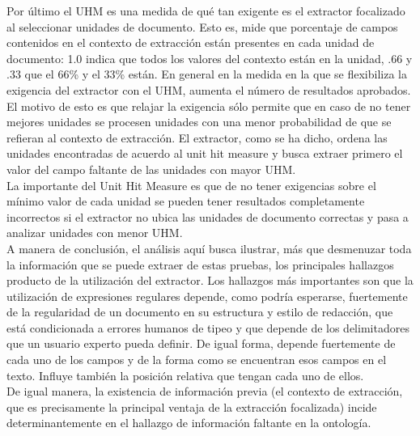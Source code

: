 Por último el UHM es una medida de qué tan exigente es el extractor focalizado al seleccionar unidades de documento. Esto es, mide que porcentaje de campos contenidos en el contexto de extracción están presentes en cada unidad de documento: 1.0 indica que todos los valores del contexto están en la unidad, .66 y .33 que el 66\% y el 33\% están. En general en la medida en la que se flexibiliza la exigencia del extractor con el UHM, aumenta el número de resultados aprobados. El motivo de esto es que relajar la exigencia sólo permite que en caso de no tener mejores unidades se procesen unidades con una menor probabilidad de que se refieran al contexto de extracción. El extractor, como se ha dicho, ordena las unidades encontradas de acuerdo al unit hit measure y busca extraer primero el valor del campo faltante de las unidades con mayor UHM. \\

La importante del Unit Hit Measure es que de no tener exigencias sobre el mínimo valor de cada unidad se pueden tener resultados completamente incorrectos si el extractor no ubica las unidades de documento correctas y pasa a analizar unidades con menor UHM. \\

A manera de conclusión, el análisis aquí busca ilustrar, más que desmenuzar toda la información que se puede extraer de estas pruebas, los principales hallazgos producto de la utilización del extractor. Los hallazgos más importantes son que la utilización de expresiones regulares depende, como podría esperarse, fuertemente de la regularidad de un documento en su estructura y estilo de redacción, que está condicionada a errores humanos de tipeo y que depende de los delimitadores que un usuario experto pueda definir. De igual forma, depende fuertemente de cada uno de los campos y de la forma como se encuentran esos campos en el texto. Influye también la posición relativa que tengan cada uno de ellos.\\

De igual manera, la existencia de información previa (el contexto de extracción, que es precisamente la principal ventaja de la extracción focalizada) incide determinantemente en el hallazgo de información faltante en la ontología.\\
